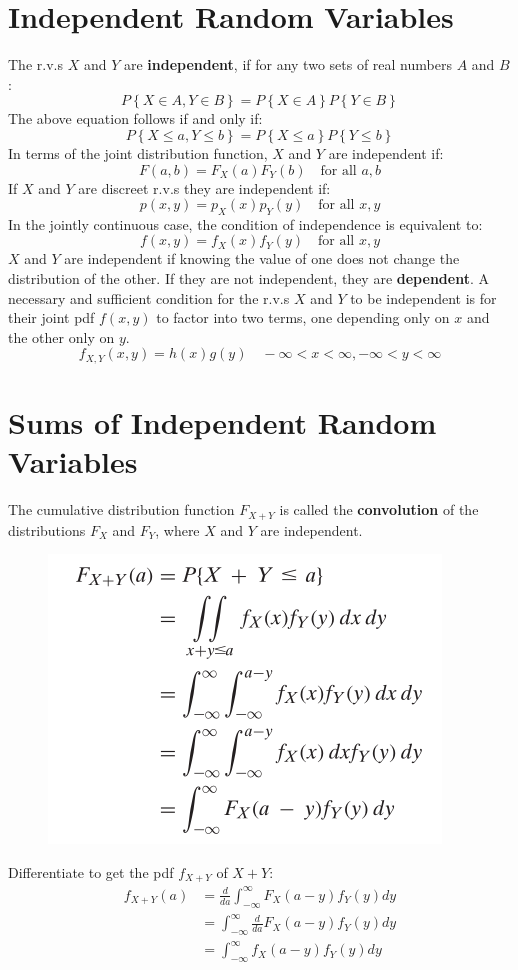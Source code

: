 \documentclass[openany]{book}
\numberwithin{equation}{section}
\begin{document}
\begin{flushleft}
\section{Independent Random Variables}
The r.v.s $X$ and $Y$ are \textbf{independent}, if for any two sets of real numbers $A$ and $B$:
\[P\left\{X \in A, Y \in B \right\}=P\left\{X \in A \right\} P\left\{Y \in B \right\}
\]
The above equation follows if and only if:
\[P\left\{X \leq a, Y \leq b \right\} = P\left\{X \leq a \right\} P\left\{Y \leq b \right\}
\]
In terms of the joint distribution function, $X$ and $Y$ are independent if:
\[F(a,b)=F_X(a)F_Y(b) \quad \text{for all }a,b
\]
If $X$ and $Y$ are discreet r.v.s they are independent if:
\[p(x,y)=p_X(x)p_Y(y) \quad \text{for all } x,y
\]
In the jointly continuous case, the condition of independence is equivalent to:
\[f(x,y)=f_X(x)f_Y(y) \quad \text{for all } x,y
\]
$X$ and $Y$ are independent if knowing the value of one does not change the distribution of the other. If they are not independent, they are \textbf{dependent}. \medbreak
A necessary and sufficient condition for the r.v.s $X$ and $Y$ to be independent is for their joint pdf $f(x,y)$ to factor into two terms, one depending only on $x$ and the other only on $y$.
\[f_{X,Y}(x,y)=h(x)g(y) \quad -\infty<x<\infty, -\infty<y<\infty
\]
\section{Sums of Independent Random Variables}
The cumulative distribution function $F_{X+Y}$ is called the \textbf{convolution} of the distributions $F_X$ and $F_Y$, where $X$ and $Y$ are independent.
\begin{figure}[H]
\includegraphics[scale=.7]{convo1.png}
\end{figure}
Differentiate to get the pdf $f_{X+Y}$ of $X+Y$:
\begin{align*}
\label{3.2}
\tag{3.2}
f_{X+Y}(a)&= \frac{d}{da}\int_{-\infty}^{\infty}F_X(a-y)f_Y(y)dy\\
&= \int_{-\infty}^{\infty}\frac{d}{da}F_X(a-y)f_Y(y)dy\\
&=\int_{-\infty}^{\infty}f_X(a-y)f_Y(y)dy
\end{align*}

\end{flushleft}
\end{document}
